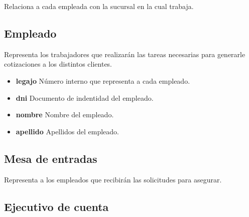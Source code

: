 \documentclass[a4paper,11pt]{article}
\begin{document}
Relaciona a cada empleada con la sucursal en la cual trabaja.

\subsection{Empleado}

Representa los trabajadores que realizarán las tareas necesarias para generarle cotizaciones
a los distintos clientes.

\begin{itemize}
   
  \item \textbf{legajo} Número interno que representa a cada empleado.
  
  \item \textbf{dni} Documento de indentidad del empleado.
  
  \item \textbf{nombre} Nombre del empleado.
  
  \item \textbf{apellido} Apellidos del empleado.
  
\end{itemize}



   
  
  

\subsection{Mesa de entradas}

Representa a los empleados que recibirán las solicitudes para asegurar.

\subsection{Ejecutivo de cuenta}
\end{document}

